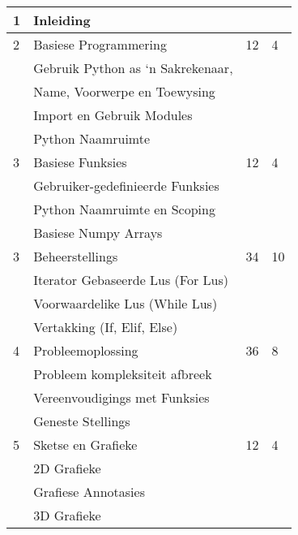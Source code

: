 \begin{longtable}{|p{2.0cm}|p{7.6cm}|p{2.0cm}|p{1.8cm}|}
             1  & Inleiding                                    &    &    \\
             \hline
             2  & Basiese Programmering                        & 12 & 4  \\
                & \qquad Gebruik Python as `n Sakrekenaar,     &    &    \\
                & \qquad Name, Voorwerpe en Toewysing          &    &    \\
                & \qquad Import en Gebruik Modules             &    &    \\
                & \qquad Python Naamruimte                     &    &    \\
             \hline
             3  & Basiese Funksies                             & 12 & 4  \\
                & \qquad Gebruiker-gedefinieerde Funksies      &    &    \\
                & \qquad Python Naamruimte en Scoping          &    &    \\
                & \qquad Basiese Numpy Arrays                  &    &    \\
             \hline
             3  & Beheerstellings                              & 34 & 10 \\
                & \qquad Iterator Gebaseerde Lus (For Lus)     &    &    \\
                & \qquad Voorwaardelike Lus (While Lus)        &    &    \\
                & \qquad Vertakking (If, Elif, Else)           &    &    \\
             \hline
             4  & Probleemoplossing                            & 36 & 8  \\
                & \qquad Probleem kompleksiteit afbreek        &    &    \\
                & \qquad Vereenvoudigings met Funksies         &    &    \\
                & \qquad Geneste Stellings                     &    &    \\
             \hline
             5  & Sketse en Grafieke                           & 12 & 4  \\
                & \qquad 2D Grafieke                           &    &    \\
                & \qquad Grafiese Annotasies                   &    &    \\
                & \qquad 3D Grafieke                           &    &    \\

\end{longtable}
